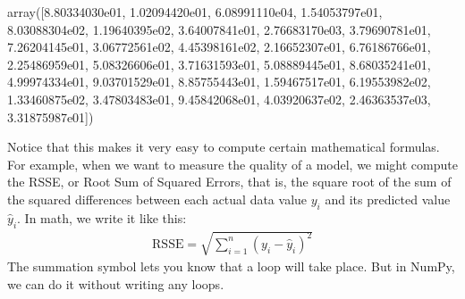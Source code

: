 \documentclass[letterpaper,10pt,english]{jupyterBook}
\begin{document}
\begin{sphinxVerbatim}[commandchars=\\\{\}]
array([8.80334030e\PYGZhy{}01, 1.02094420e\PYGZhy{}01, 6.08991110e\PYGZhy{}04, 1.54053797e\PYGZhy{}01,
       8.03088304e\PYGZhy{}02, 1.19640395e\PYGZhy{}02, 3.64007841e\PYGZhy{}01, 2.76683170e\PYGZhy{}03,
       3.79690781e\PYGZhy{}01, 7.26204145e\PYGZhy{}01, 3.06772561e\PYGZhy{}02, 4.45398161e\PYGZhy{}02,
       2.16652307e\PYGZhy{}01, 6.76186766e\PYGZhy{}01, 2.25486959e\PYGZhy{}01, 5.08326606e\PYGZhy{}01,
       3.71631593e\PYGZhy{}01, 5.08889445e\PYGZhy{}01, 8.68035241e\PYGZhy{}01, 4.99974334e\PYGZhy{}01,
       9.03701529e\PYGZhy{}01, 8.85755443e\PYGZhy{}01, 1.59467517e\PYGZhy{}01, 6.19553982e\PYGZhy{}02,
       1.33460875e\PYGZhy{}02, 3.47803483e\PYGZhy{}01, 9.45842068e\PYGZhy{}01, 4.03920637e\PYGZhy{}02,
       2.46363537e\PYGZhy{}03, 3.31875987e\PYGZhy{}01])
\end{sphinxVerbatim}

\sphinxAtStartPar
Notice that this makes it very easy to compute certain mathematical formulas.  For example, when we want to measure the quality of a model, we might compute the RSSE, or Root Sum of Squared Errors, that is, the square root of the sum of the squared differences between each actual data value \(y_i\) and its predicted value \(\hat y_i\).  In math, we write it like this:
\begin{equation*}
\begin{split} \text{RSSE} = \sqrt{\sum_{i=1}^n (y_i-\hat y_i)^2} \end{split}
\end{equation*}
\sphinxAtStartPar
The summation symbol lets you know that a loop will take place.  But in NumPy, we can do it without writing any loops.

\begin{sphinxVerbatim}[commandchars=\\\{\}]
      \PYG{p}{[}      \PYG{p}{]}    
   \PYG{p}{[}      \PYG{p}{]}    
           
\end{sphinxVerbatim}
\end{document}
